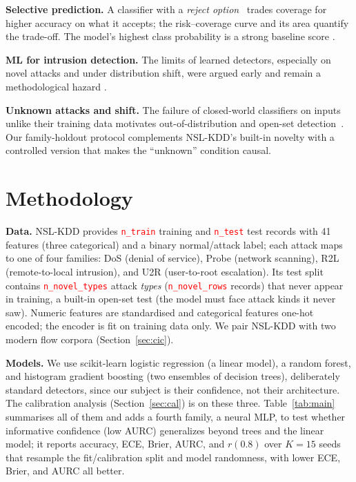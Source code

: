 \documentclass[conference,a4paper]{IEEEtran}
\newcommand{\PH}[1]{\textcolor{red}{\texttt{#1}}}
\begin{document}
\textbf{Selective prediction.} A classifier with a \emph{reject option}~\cite{elyaniv2010selective}
trades coverage for higher accuracy on what it accepts; the risk--coverage curve and its
area \cite{geifman2017selective} quantify the trade-off. The model's highest class probability is a
strong baseline score \cite{hendrycks2017baseline}.

\textbf{ML for intrusion detection.} The limits of learned detectors, especially on novel attacks and
under distribution shift, were argued early \cite{sommer2010outside} and remain a methodological
hazard \cite{arp2022dodos}.

\textbf{Unknown attacks and shift.} The failure of closed-world classifiers on inputs unlike their
training data motivates out-of-distribution and open-set
detection~\cite{hendrycks2017baseline}. Our family-holdout protocol
complements NSL-KDD's built-in novelty with a controlled version that makes the ``unknown'' condition
causal.

\section{Methodology}
\textbf{Data.} NSL-KDD \cite{tavallaee2009nsl} provides \PH{n_train} training and \PH{n_test} test
records with 41 features (three categorical) and a binary normal/attack label; each attack maps to one
of four families: DoS (denial of service), Probe (network scanning), R2L (remote-to-local
intrusion), and U2R (user-to-root escalation). Its test split contains \PH{n_novel_types} attack \emph{types}
(\PH{n_novel_rows} records) that never appear in training, a built-in open-set test (the model must
face attack kinds it never saw). Numeric features are standardised and categorical features one-hot
encoded; the encoder is fit on training data only. We pair NSL-KDD with two modern flow corpora
(Section~\ref{sec:cic}).

\textbf{Models.} We use scikit-learn \cite{pedregosa2011scikit} logistic regression (a linear model), a
random forest, and histogram gradient boosting (two ensembles of decision trees), deliberately standard
detectors, since our subject is their confidence, not their architecture. The calibration analysis
(Section~\ref{sec:cal}) is on these three. Table~\ref{tab:main} summarises all of them and adds a fourth
family, a neural MLP, to test whether informative confidence (low AURC) generalizes beyond trees and the
linear model; it reports accuracy, ECE, Brier, AURC, and $r(0.8)$ over $K{=}15$ seeds that resample the
fit/calibration split and model randomness, with lower ECE, Brier, and AURC all better.
\end{document}
